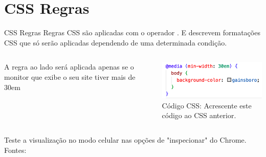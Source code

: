 \documentclass{beamer}
\begin{document}
\section{CSS Regras}
\begin{frame}{CSS Regras}
Regras CSS são aplicadas com o operador \@. E descrevem formatações CSS que só serão aplicadas dependendo de uma determinada condição.
\begin{columns}
\begin{column}{0.5\textwidth}
        A regra ao lado será aplicada apenas se o monitor que exibe o seu site tiver mais de 30em
   \end{column}
   \begin{column}{0.5\textwidth}
        \begin{center}
		  \includegraphics[height=0.2\paperheight]{fig/aula2/layout_css3.png} \\
		  \tiny{Código CSS: Acrescente este código ao CSS anterior.}
	  \end{center}
	  
   \end{column}
\end{columns}
Teste a visualização no modo celular nas opções de "inspecionar" do Chrome.\\
 \tiny Fontes: \cite{mdn2023}
\end{frame}

\end{document}
